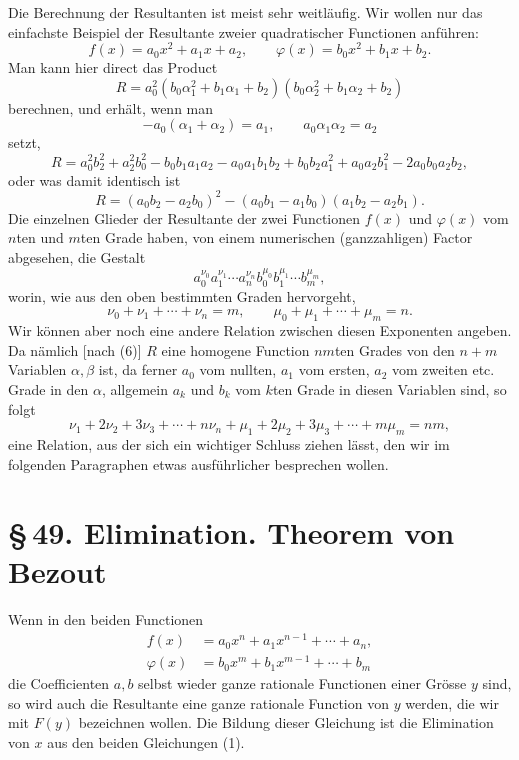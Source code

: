 \documentclass[11pt]{article}
\providecommand{\sect}[2]{\section*{\S\,#1. #2}}
\begin{document}
Die Berechnung der Resultanten ist meist sehr weitläufig. Wir wollen nur das einfachste Beispiel der Resultante zweier quadratischer Functionen anführen:
\[
f(x)=a_0x^2+a_1x+a_2,
\qquad
\varphi(x)=b_0x^2+b_1x+b_2.
\]
Man kann hier direct das Product
\[
R=a_0^2(b_0\alpha_1^2+b_1\alpha_1+b_2)(b_0\alpha_2^2+b_1\alpha_2+b_2)
\]
berechnen, und erhält, wenn man
\[
-a_0(\alpha_1+\alpha_2)=a_1,\qquad a_0\alpha_1\alpha_2=a_2
\]
setzt,
\begin{equation}
R=a_0^2b_2^2+a_2^2b_0^2-b_0b_1a_1a_2-a_0a_1b_1b_2+b_0b_2a_1^2+a_0a_2b_1^2-2a_0b_0a_2b_2,
\tag{11}
\end{equation}
oder was damit identisch ist
\begin{equation}
R=(a_0b_2-a_2b_0)^2-(a_0b_1-a_1b_0)(a_1b_2-a_2b_1).
\tag{12}
\end{equation}
Die einzelnen Glieder der Resultante der zwei Functionen $f(x)$ und $\varphi(x)$ vom $n$ten und $m$ten Grade haben, von einem numerischen (ganzzahligen) Factor abgesehen, die Gestalt
\begin{equation}
a_0^{\nu_0}a_1^{\nu_1}\cdots a_n^{\nu_n} b_0^{\mu_0}b_1^{\mu_1}\cdots b_m^{\mu_m},
\tag{13}
\end{equation}
worin, wie aus den oben bestimmten Graden hervorgeht,
\begin{equation}
\nu_0+\nu_1+\cdots+\nu_n=m,\qquad
\mu_0+\mu_1+\cdots+\mu_m=n.
\tag{14}
\end{equation}
Wir können aber noch eine andere Relation zwischen diesen Exponenten angeben. Da nämlich [nach (6)] $R$ eine homogene Function $nm$ten Grades von den $n+m$ Variablen $\alpha,\beta$ ist, da ferner $a_0$ vom nullten, $a_1$ vom ersten, $a_2$ vom zweiten etc. Grade in den $\alpha$, allgemein $a_k$ und $b_k$ vom $k$ten Grade in diesen Variablen sind, so folgt
\begin{equation}
\nu_1+2\nu_2+3\nu_3+\cdots+n\nu_n+
\mu_1+2\mu_2+3\mu_3+\cdots+m\mu_m=nm,
\tag{15}
\end{equation}
eine Relation, aus der sich ein wichtiger Schluss ziehen lässt, den wir im folgenden Paragraphen etwas ausführlicher besprechen wollen.

\sect{49}{Elimination. Theorem von Bezout}

Wenn in den beiden Functionen
\begin{equation}
\begin{aligned}
f(x)&=a_0x^n+a_1x^{n-1}+\cdots+a_n,\\
\varphi(x)&=b_0x^m+b_1x^{m-1}+\cdots+b_m
\end{aligned}
\tag{1}
\end{equation}
die Coefficienten $a,b$ selbst wieder ganze rationale Functionen einer Grösse $y$ sind, so wird auch die Resultante eine ganze rationale Function von $y$ werden, die wir mit $F(y)$ bezeichnen wollen. Die Bildung dieser Gleichung ist die Elimination von $x$ aus den beiden Gleichungen (1).
\end{document}
